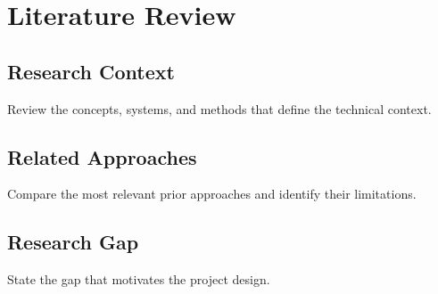 \chapter{Literature Review}

\section{Research Context}
Review the concepts, systems, and methods that define the technical context.

\section{Related Approaches}
Compare the most relevant prior approaches and identify their limitations.

\section{Research Gap}
State the gap that motivates the project design.
